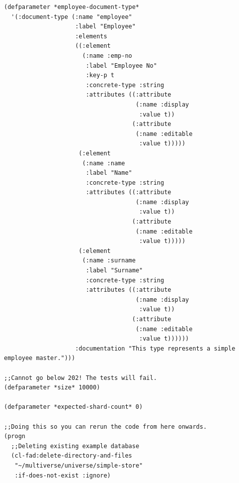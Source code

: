 \documentclass[11pt]{article}
\begin{document}
\begin{verbatim}
(defparameter *employee-document-type*
  '(:document-type (:name "employee"
                    :label "Employee"
                    :elements
                    ((:element
                      (:name :emp-no
                       :label "Employee No"
                       :key-p t
                       :concrete-type :string
                       :attributes ((:attribute
                                     (:name :display
                                      :value t))
                                    (:attribute
                                     (:name :editable
                                      :value t)))))
                     (:element
                      (:name :name
                       :label "Name"
                       :concrete-type :string
                       :attributes ((:attribute
                                     (:name :display
                                      :value t))
                                    (:attribute
                                     (:name :editable
                                      :value t)))))
                     (:element
                      (:name :surname
                       :label "Surname"
                       :concrete-type :string
                       :attributes ((:attribute
                                     (:name :display
                                      :value t))
                                    (:attribute
                                     (:name :editable
                                      :value t))))))
                    :documentation "This type represents a simple employee master.")))

;;Cannot go below 202! The tests will fail.
(defparameter *size* 10000)

(defparameter *expected-shard-count* 0)

;;Doing this so you can rerun the code from here onwards.
(progn
  ;;Deleting existing example database
  (cl-fad:delete-directory-and-files
   "~/multiverse/universe/simple-store"
   :if-does-not-exist :ignore)


\end{verbatim}
\end{document}
